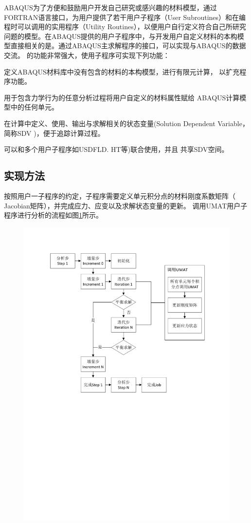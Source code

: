     ABAQUS为了方便和鼓励用户开发自己研究或感兴趣的材料模型，通过
FORTRAN语言接口，为用户提供了若干用户子程序（User Subroutines）和在编程时可以调用的实用程序（Utility Routines），以便用户自行定义符合自己所研究问题的模型。在ABAQUS提供的用户子程序中，与开发用户自定义材料的本构模型直接相关的是\uma 。通过ABAQUS主求解程序的接口，\uma 可以实现与ABAQUS的数据交流。
    \uma 的功能非常强大，使用\uma 子程序可实现下列功能\cite{lijinzhu2011}：
 \begin{compactenum}
\item 定义ABAQUS材料库中没有包含的材料的本构模型，进行有限元计算，
 	    以扩充程序功能。
\item 用于包含力学行为的任意分析过程将用户自定义的材料属性赋给
 	    ABAQUS计算模型中的任何单元。
\item 在计算中定义、使用、输出与求解相关的状态变量(Solution Dependent
 	    Variable，简称SDV )，便于追踪计算过程。
\item 可以和多个用户子程序如USDFLD. \uma HT等)联合使用，并且
 	    共享SDV空间。
 \end{compactenum}

\subsection{\uma 实现方法}

按照\aba 用户一子程序的约定，\uma 子程序需要定义单元积分点的材料刚度系数矩阵（ Jacobian矩阵），并完成应力、应变以及求解状态变量的更新。
调用UMAT用户子程序进行分析的流程如图\ref{fig:umat-diaoyong}所示。
\begin{figure}[!htp]
	\centering
	\includegraphics[width=0.7\linewidth]{figure/chap3/umat-diaoyong}
	\label{fig:umat-diaoyong}
\end{figure}


